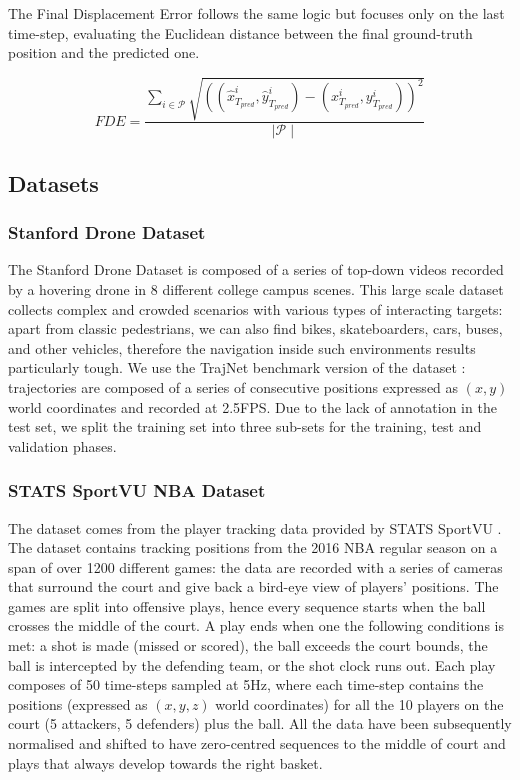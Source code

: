 \documentclass[10pt,a4paper,conference]{IEEEtran}
\begin{document}
The Final Displacement Error follows the same logic but focuses only on the last time-step, evaluating the Euclidean distance between the final ground-truth position and the predicted one.

\begin{equation}
    \label{eq:fde}
    FDE = \frac{
                \sum_{i \in \mathcal{P}} 
                \sqrt{((\hat{x}_{T_{pred}}^{i}, \hat{y}_{T_{pred}}^{i}) - (x_{T_{pred}}^{i}, y_{T_{pred}}^{i}))^{2}}
            } 
            {
                \mid \mathcal{P} \mid
            }
\end{equation}


\subsection{Datasets}

\subsubsection{Stanford Drone Dataset}
The Stanford Drone Dataset \cite{sdd} is composed of a series of top-down videos recorded by a hovering drone in 8 different college campus scenes. This large scale dataset collects complex and crowded scenarios with various types of interacting targets: apart from classic pedestrians, we can also find bikes, skateboarders, cars, buses, and other vehicles, therefore the navigation inside such environments results particularly tough. We use the TrajNet benchmark version of the dataset \cite{trajnet2018}: trajectories are composed of a series of consecutive positions expressed as $(x,y)$ world coordinates and recorded at 2.5FPS. Due to the lack of annotation in the test set, we split the training set into three sub-sets for the training, test and validation phases.


\subsubsection{STATS SportVU NBA Dataset}
The dataset comes from the player tracking data provided by STATS SportVU \cite{stats_sportvu}. The dataset contains tracking positions from the 2016 NBA regular season on a span of over 1200 different games: the data are recorded with a series of cameras that surround the court and give back a bird-eye view of players' positions. The games are split into offensive plays, hence every sequence starts when the ball crosses the middle of the court. A play ends when one the following conditions is met: a shot is made (missed or scored), the ball exceeds the court bounds, the ball is intercepted by the defending team, or the shot clock runs out. Each play composes of 50 time-steps sampled at 5Hz, where each time-step contains the positions (expressed as $(x,y,z)$ world coordinates) for all the 10 players on the court (5 attackers, 5 defenders) plus the ball. All the data have been subsequently normalised and shifted to have zero-centred sequences to the middle of court and plays that always develop towards the right basket.
\end{document}
